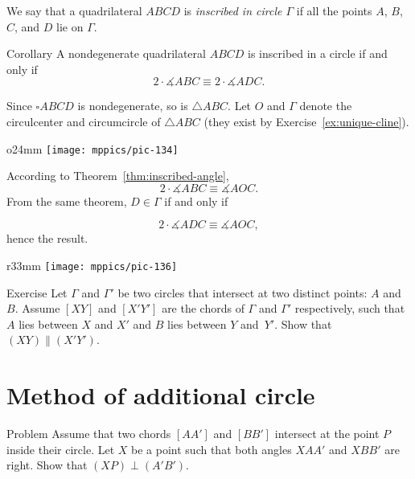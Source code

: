 We say that a quadrilateral $ABCD$ is 
\emph{inscribed in circle $\Gamma$}
if all the points $A$, $B$, $C$, and $D$ lie on $\Gamma$.

\begin{thm}{Corollary}\label{cor:inscribed-quadrilateral}
A nondegenerate quadrilateral $ABCD$ is inscribed in a circle if and only if 
\[2\cdot\measuredangle ABC\equiv 2\cdot\measuredangle ADC.\]

\end{thm}

Since $\square ABCD$ is nondegenerate, so is $\triangle ABC$.
Let $O$ and $\Gamma$ denote the circulcenter and circumcircle of $\triangle ABC$ (they exist by Exercise~\ref{ex:unique-cline}).

{

\begin{wrapfigure}[10]{o}{24mm}
\vskip-0mm
\centering
\texttt{[image: mppics/pic-134]}
\end{wrapfigure}

According to Theorem~\ref{thm:inscribed-angle},
$$
2\cdot\measuredangle ABC
\equiv
\measuredangle AOC.
$$
From the same theorem, $D\in\Gamma$ if and only if 

$$
2\cdot\measuredangle ADC
\equiv\measuredangle AOC,
$$
hence the result.
\qeds

}


{

\begin{wrapfigure}{r}{33mm}
\vskip-6mm
\centering
\texttt{[image: mppics/pic-136]}
\end{wrapfigure}

\begin{thm}{Exercise}\label{ex:secant-circles}
Let $\Gamma$ and $\Gamma'$
be two circles 
that intersect at two distinct points: $A$ and~$B$.
Assume $[XY]$ and $[X'Y']$ are the chords of $\Gamma$ and $\Gamma'$ respectively,
such that $A$ lies between $X$ and $X'$ and $B$ lies between $Y$ and~$Y'$.
Show that $(XY)\parallel (X'Y')$.
\end{thm}

}

\section*{Method of additional circle}

\begin{thm}{Problem}\label{prob:add-circ}
Assume that two chords $[AA']$ and $[BB']$ intersect at the point $P$ inside their circle.
Let $X$ be a point such that both angles $XAA'$ and $XBB'$ are right.
Show that $(XP)\perp(A'B')$.
\end{thm}

